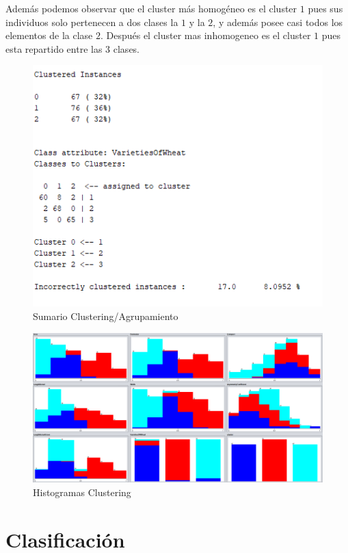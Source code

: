 \documentclass[a4paper, 11pt, twoside, openany, onecolumn, final]{memoir}
\begin{document}
Además podemos observar que el cluster más homogéneo es el cluster $1$ pues sus individuos solo pertenecen a dos clases la $1$ y la $2$, y además posee casi todos los elementos de la clase $2$. Después el cluster mas inhomogeneo es el cluster $1$ pues esta repartido entre las $3$ clases. 


	\begin{figure}
  		\centering
   		\includegraphics{Imagenes/SumarioClustering}
  		\caption{Sumario Clustering/Agrupamiento}
  		\label{SumarioClustering}
	\end{figure}	
	
	\begin{figure}
  		\centering
   		\includegraphics[width=1\textwidth]{Imagenes/Clustering}
  		\caption{Histogramas Clustering}
  		\label{ClusteringHistogramas}
	\end{figure}
\chapter{Clasificación}
\end{document}
